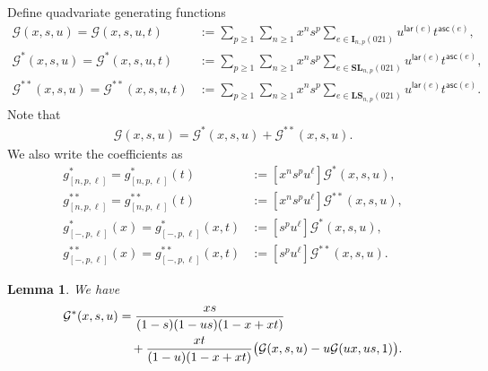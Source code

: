 \documentclass[reqno]{amsart}
\numberwithin{equation}{section}
\theoremstyle{plain}
\newtheorem{lemma}[theorem]{Lemma}
\theoremstyle{definition}
\theoremstyle{named}
\newcommand{\bI}{\mathbf{I}}
\newcommand{\bSL}{\mathbf{SL}}
\newcommand{\bLS}{\mathbf{LS}}
\newcommand{\asc}{\mathsf{asc}}
\newcommand{\lar}{\mathsf{lar}}
\newcommand{\cG}{\mathcal{G}}
\begin{document}
Define quadvariate generating functions
\begin{align*}
	\cG(x,s,u)=\cG(x,s,u,t)&:=\sum_{p\ge 1}\sum_{n\ge 1}x^ns^p \sum_{e\in\bI_{n,p}(021)}u^{\lar(e)}t^{\asc(e)},\\
	\cG^*(x,s,u)=\cG^*(x,s,u,t)&:=\sum_{p\ge 1}\sum_{n\ge 1}x^ns^p \sum_{e\in\bSL_{n,p}(021)}u^{\lar(e)}t^{\asc(e)},\\
	\cG^{**}(x,s,u)=\cG^{**}(x,s,u,t)&:=\sum_{p\ge 1}\sum_{n\ge 1}x^ns^p \sum_{e\in\bLS_{n,p}(021)}u^{\lar(e)}t^{\asc(e)}.
\end{align*}
Note that
\begin{align}\label{eq:G-G*-G**}
	\cG(x,s,u)=\cG^*(x,s,u)+\cG^{**}(x,s,u).
\end{align}
We also write the coefficients as
\begin{align*}
	g^*_{[n,p,\ell]}=g^*_{[n,p,\ell]}(t)&:=[x^n s^p u^\ell]\cG^*(x,s,u),\\
	g^{**}_{[n,p,\ell]}=g^{**}_{[n,p,\ell]}(t)&:=[x^n s^p u^\ell]\cG^{**}(x,s,u),\\
	g^*_{[-,p,\ell]}(x)=g^*_{[-,p,\ell]}(x,t)&:=[s^p u^\ell]\cG^*(x,s,u),\\
	g^{**}_{[-,p,\ell]}(x)=g^{**}_{[-,p,\ell]}(x,t)&:=[s^p u^\ell]\cG^{**}(x,s,u).
\end{align*}

\begin{lemma}
	We have
	\begin{align}\label{eq:G*-func-eqn}
		\cG^*(x,s,u) &= \frac{xs}{(1-s)(1-us)(1-x+xt)}\notag\\
		&\quad+\frac{xt}{(1-u)(1-x+xt)}\big(\cG(x,s,u)-u\cG(ux,us,1)\big).
	\end{align}
\end{lemma}
\end{document}
